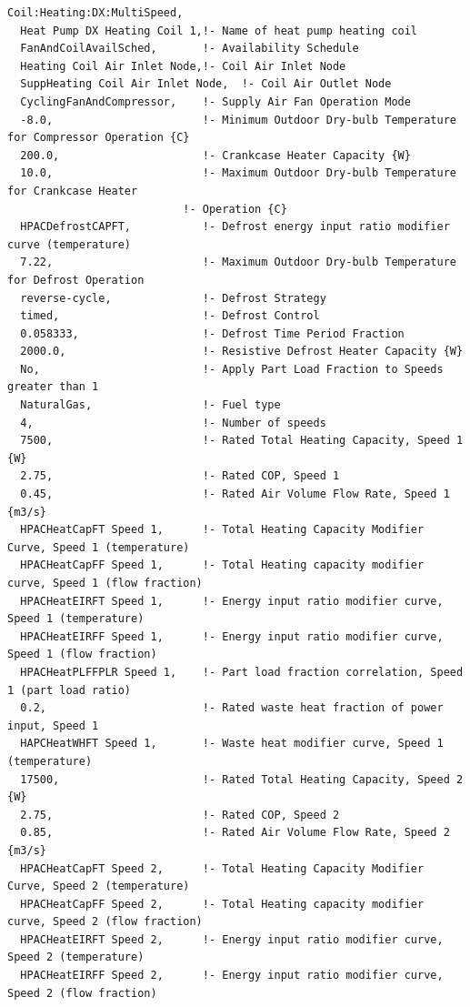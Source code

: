 \begin{lstlisting}
Coil:Heating:DX:MultiSpeed,
  Heat Pump DX Heating Coil 1,!- Name of heat pump heating coil
  FanAndCoilAvailSched,       !- Availability Schedule
  Heating Coil Air Inlet Node,!- Coil Air Inlet Node
  SuppHeating Coil Air Inlet Node,  !- Coil Air Outlet Node
  CyclingFanAndCompressor,    !- Supply Air Fan Operation Mode
  -8.0,                       !- Minimum Outdoor Dry-bulb Temperature for Compressor Operation {C}
  200.0,                      !- Crankcase Heater Capacity {W}
  10.0,                       !- Maximum Outdoor Dry-bulb Temperature for Crankcase Heater
                           !- Operation {C}
  HPACDefrostCAPFT,           !- Defrost energy input ratio modifier curve (temperature)
  7.22,                       !- Maximum Outdoor Dry-bulb Temperature for Defrost Operation
  reverse-cycle,              !- Defrost Strategy
  timed,                      !- Defrost Control
  0.058333,                   !- Defrost Time Period Fraction
  2000.0,                     !- Resistive Defrost Heater Capacity {W}
  No,                         !- Apply Part Load Fraction to Speeds greater than 1
  NaturalGas,                 !- Fuel type
  4,                          !- Number of speeds
  7500,                       !- Rated Total Heating Capacity, Speed 1 {W}
  2.75,                       !- Rated COP, Speed 1
  0.45,                       !- Rated Air Volume Flow Rate, Speed 1 {m3/s}
  HPACHeatCapFT Speed 1,      !- Total Heating Capacity Modifier Curve, Speed 1 (temperature)
  HPACHeatCapFF Speed 1,      !- Total Heating capacity modifier curve, Speed 1 (flow fraction)
  HPACHeatEIRFT Speed 1,      !- Energy input ratio modifier curve, Speed 1 (temperature)
  HPACHeatEIRFF Speed 1,      !- Energy input ratio modifier curve, Speed 1 (flow fraction)
  HPACHeatPLFFPLR Speed 1,    !- Part load fraction correlation, Speed 1 (part load ratio)
  0.2,                        !- Rated waste heat fraction of power input, Speed 1
  HAPCHeatWHFT Speed 1,       !- Waste heat modifier curve, Speed 1 (temperature)
  17500,                      !- Rated Total Heating Capacity, Speed 2 {W}
  2.75,                       !- Rated COP, Speed 2
  0.85,                       !- Rated Air Volume Flow Rate, Speed 2 {m3/s}
  HPACHeatCapFT Speed 2,      !- Total Heating Capacity Modifier Curve, Speed 2 (temperature)
  HPACHeatCapFF Speed 2,      !- Total Heating capacity modifier curve, Speed 2 (flow fraction)
  HPACHeatEIRFT Speed 2,      !- Energy input ratio modifier curve, Speed 2 (temperature)
  HPACHeatEIRFF Speed 2,      !- Energy input ratio modifier curve, Speed 2 (flow fraction)

\end{lstlisting}
